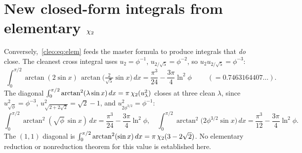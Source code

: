 \section{New closed-form integrals from elementary $\chi_2$}
Conversely,~\eqref{cleo:eq:elem} feeds the master formula to produce integrals that \emph{do} close. The
cleanest cross integral uses $u_2=\phi^{-1}$, $u_{2/\sqrt5}=\phi^{-2}$, so $u_2u_{2/\sqrt5}=\phi^{-3}$:
\begin{equation}\label{cleo:eq:A}
  \boxed{\;\int_0^{\pi/2}\arctan(2\sin x)\,\arctan\!\bigl(\tfrac2{\sqrt5}\sin x\bigr)\,dx
  =\frac{\pi^3}{24}-\frac{3\pi}{4}\ln^2\phi\;}\qquad(=0.7463164407\ldots).
\end{equation}
The diagonal $\int_0^{\pi/2}\arctan^2(\lambda\sin x)\,dx=\pi\,\chi_2(u_\lambda^2)$ closes at three clean
$\lambda$, since $u_{\sqrt\phi}^2=\phi^{-3}$, $u_{\sqrt{2+2\sqrt2}}^2=\sqrt2-1$, and $u_{2\phi^{3/2}}^2=\phi^{-1}$:
\begin{equation}\label{cleo:eq:diag}
  \int_0^{\pi/2}\!\arctan^2(\sqrt\phi\,\sin x)\,dx=\frac{\pi^3}{24}-\frac{3\pi}{4}\ln^2\phi,\quad
  \int_0^{\pi/2}\!\arctan^2\!\bigl(2\phi^{3/2}\sin x\bigr)\,dx=\frac{\pi^3}{12}-\frac{3\pi}{4}\ln^2\phi.
\end{equation}
The $(1,1)$ diagonal is $\int_0^{\pi/2}\arctan^2(\sin x)\,dx=\pi\,\chi_2(3-2\sqrt2)$. No elementary reduction or nonreduction theorem for this value is established here.

